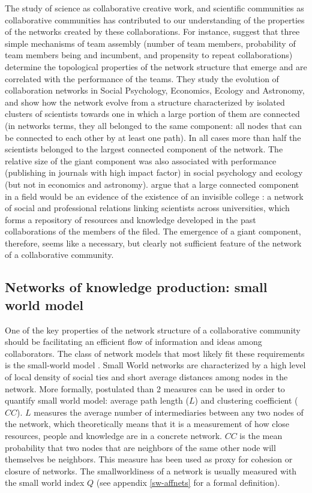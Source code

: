 The study of science as collaborative creative work, and scientific communities as collaborative communities has contributed to our understanding of the properties of the networks created by these collaborations. For instance, \citet{guimera:2005} suggest that three simple mechanisms of team assembly (number of team members, probability of team members being and incumbent, and propensity to repeat collaborations) determine the topological properties of the network structure that emerge and are correlated with the performance of the teams. They study the evolution of collaboration networks in Social Psychology, Economics, Ecology and Astronomy, and show how the network evolve from a structure characterized by isolated clusters of scientists towards one in which a large portion of them are connected (in networks terms, they all belonged to the same component: all nodes that can be connected to each other by at least one path). In all cases more than half the scientists belonged to the largest connected component of the network. The relative size of the giant component was also associated with performance (publishing in journals with high impact factor) in social psychology and ecology (but not in economics and astronomy). \citet{guimera:2005}  argue that a large connected component in a field would be an evidence of the existence of an invisible college \citep{solla:1986,merton:1979}: a network of social and professional relations linking scientists across universities, which forms a repository of resources and knowledge developed in the past collaborations of the members of the filed.  The emergence of a giant component, therefore, seems like a necessary, but clearly not sufficient feature of the network of a collaborative community.

\subsection{Networks of knowledge production: small world model}

One of the key properties of the network structure of a collaborative community should be facilitating an efficient flow of information and ideas among collaborators. The class of network models that most likely fit these requirements is the small-world model \citep{watts:1998}. Small World networks are characterized by a high level of local density of social ties and short average distances among nodes in the network. More formally,\citet{watts:1998} postulated than 2 measures can be used in order to quantify small world model: average path length ($L$) and clustering coefficient ($CC$). $L$ measures the average number of intermediaries between any two nodes of the network, which theoretically means that it is a measurement of how close resources, people and knowledge are in a concrete network. $CC$ is the mean probability that two nodes that are neighbors of the same other node will themselves be neighbors. This measure has been used as proxy for cohesion or closure of networks. The smallworldiness of a network is usually measured with the small world index $Q$ (see appendix \ref{sw-affnets} for a formal definition).

